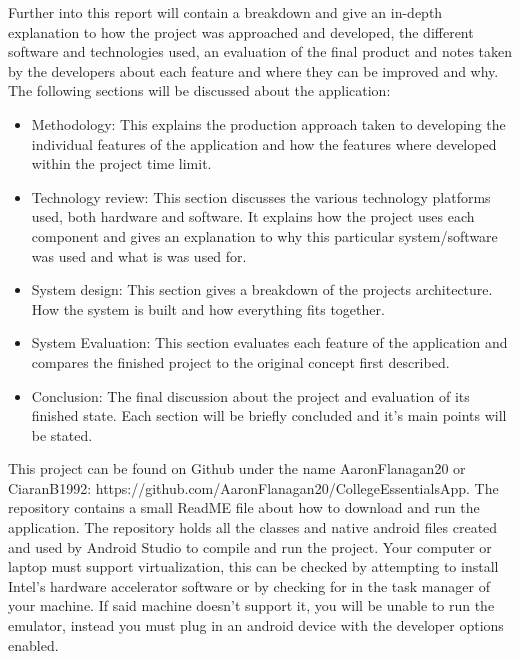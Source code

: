 Further into this report will contain a breakdown and give an in-depth explanation to how the project was approached and developed, the different software and technologies used, an evaluation of the final product and notes taken by the developers about each feature and where they can be improved and why. The following sections will be discussed about the application:
\begin{itemize}
\item Methodology: This explains the production approach taken to developing the individual features of the application and how the features where developed within the project time limit.
\item Technology review: This section discusses the various technology platforms used, both hardware and software. It explains how the project uses each component and gives an explanation to why this particular system/software was used and what is was used for.
\item System design: This section gives a breakdown of the projects architecture. How the system is built and how everything fits together.
\item System Evaluation: This section evaluates each feature of the application and compares the finished project to the original concept first described.
\item Conclusion: The final discussion about the project and evaluation of its finished state. Each section will be briefly concluded and it's main points will be stated.
\end{itemize}

This project can be found on Github under the name AaronFlanagan20 or CiaranB1992: https://github.com/AaronFlanagan20/CollegeEssentialsApp.
The repository contains a small ReadME file about how to download and run the application. The repository holds all the classes and native android files created and used by Android Studio to compile and run the project. Your computer or laptop must support virtualization, this can be checked by attempting to install Intel's hardware accelerator software or by checking for in the task manager of your machine. If said machine doesn't support it, you will be unable to run the emulator, instead you must plug in an android device with the developer options enabled.

